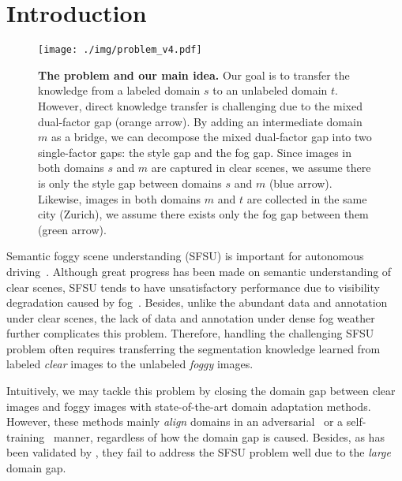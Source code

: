 \documentclass[10pt,twocolumn,letterpaper]{article}
\def\imd{m}
\def\td{t}
\begin{document}
\section{Introduction}

\begin{figure}[t]
\centering
\texttt{[image: ./img/problem\_v4.pdf]}\\
\vspace{-2mm}
\caption{\textbf{The problem and our main idea.} Our goal is to transfer the knowledge from a labeled domain $s$ to an unlabeled domain $\td$. However, direct knowledge transfer is challenging due to the mixed dual-factor gap (orange arrow). By adding an intermediate domain $\imd$ as a bridge, we can decompose the mixed dual-factor gap into two single-factor gaps: the style gap and the fog gap. Since images in both domains $s$ and $\imd$ are captured in clear scenes, we assume there is only the style gap between domains $s$ and $\imd$ (blue arrow). Likewise, images in both domains $\imd$ and $\td$ are collected in the same city (Zurich), we assume there exists only the fog gap between them (green arrow). 
}
\vspace{-4mm}
\label{fig:problem}
\end{figure}

Semantic foggy scene understanding (SFSU) is important for autonomous driving~\cite{sakaridis2018model,sakaridis2018semantic,dai2020curriculum,2019Purely}.
Although great progress has been made on semantic understanding of clear scenes, SFSU tends to have unsatisfactory performance due to visibility degradation caused by fog~\cite{narasimhan2003contrast,tan2008visibility}.
Besides, unlike the abundant data and annotation under clear scenes, the lack of data and annotation under dense fog weather further complicates this problem.
Therefore, handling the challenging SFSU problem often requires transferring the segmentation knowledge learned from labeled \emph{clear} images to the unlabeled \emph{foggy} images. 

Intuitively, we may tackle this problem by closing the domain gap between clear images and foggy images with state-of-the-art domain adaptation methods.
However, these methods mainly \emph{align} domains in an adversarial~\cite{tsai2018learning,Zhang_2018_CVPR,Chen_2018_CVPR,vu2019advent,chang2019all,Kim_2020_CVPR,li2020content,truong2021bimal,wang2020classes,yang2020fda} or a self-training~\cite{Choi_2019_ICCV,mei2020instance,tranheden2021dacs,araslanov2021self,guo2021metacorrection,gao2021dsp,zhang2021prototypical} manner, 
regardless of how the domain gap is caused. Besides, as has been validated by \cite{sakaridis2018model}, they fail to address the SFSU problem well due to the \emph{large} domain gap.
\end{document}
